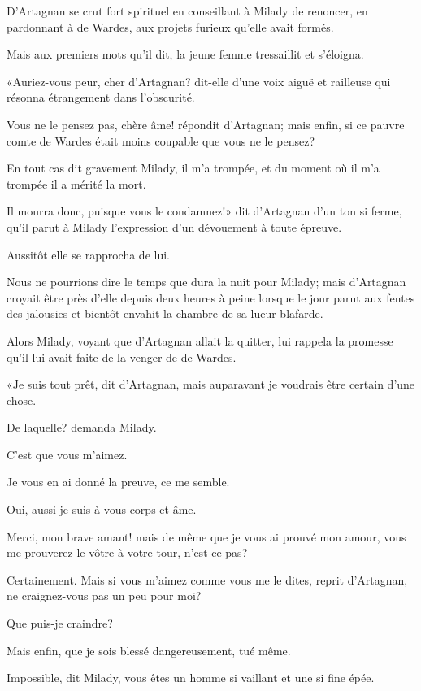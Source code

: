 D'Artagnan se crut fort spirituel en conseillant à Milady de renoncer, en pardonnant à de Wardes, aux projets furieux qu'elle avait formés. 

Mais aux premiers mots qu'il dit, la jeune femme tressaillit et s'éloigna. 

«Auriez-vous peur, cher d'Artagnan? dit-elle d'une voix aiguë et railleuse qui résonna étrangement dans l'obscurité. 

\speak  Vous ne le pensez pas, chère âme! répondit d'Artagnan; mais enfin, si ce pauvre comte de Wardes était moins coupable que vous ne le pensez? 

\speak  En tout cas dit gravement Milady, il m'a trompée, et du moment où il m'a trompée il a mérité la mort. 

\speak  Il mourra donc, puisque vous le condamnez!» dit d'Artagnan d'un ton si ferme, qu'il parut à Milady l'expression d'un dévouement à toute épreuve. 

Aussitôt elle se rapprocha de lui. 

Nous ne pourrions dire le temps que dura la nuit pour Milady; mais d'Artagnan croyait être près d'elle depuis deux heures à peine lorsque le jour parut aux fentes des jalousies et bientôt envahit la chambre de sa lueur blafarde. 

Alors Milady, voyant que d'Artagnan allait la quitter, lui rappela la promesse qu'il lui avait faite de la venger de de Wardes. 

«Je suis tout prêt, dit d'Artagnan, mais auparavant je voudrais être certain d'une chose. 

\speak  De laquelle? demanda Milady. 

\speak  C'est que vous m'aimez. 

\speak  Je vous en ai donné la preuve, ce me semble. 

\speak  Oui, aussi je suis à vous corps et âme. 

\speak  Merci, mon brave amant! mais de même que je vous ai prouvé mon amour, vous me prouverez le vôtre à votre tour, n'est-ce pas? 

\speak  Certainement. Mais si vous m'aimez comme vous me le dites, reprit d'Artagnan, ne craignez-vous pas un peu pour moi? 

\speak  Que puis-je craindre? 

\speak  Mais enfin, que je sois blessé dangereusement, tué même. 

\speak  Impossible, dit Milady, vous êtes un homme si vaillant et une si fine épée. 

